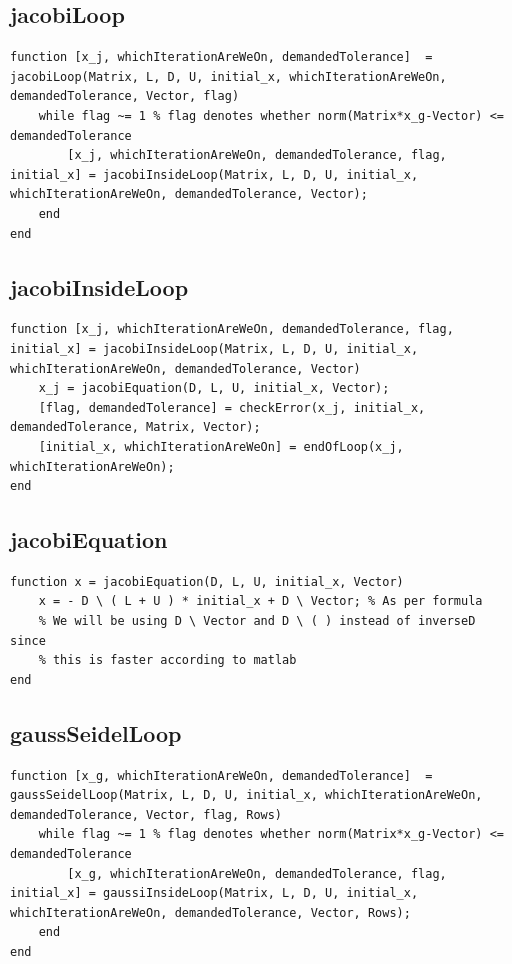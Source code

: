 \newpage
\subsection{jacobiLoop}
\begin{simplechar}
\begin{lstlisting}
function [x_j, whichIterationAreWeOn, demandedTolerance]  = jacobiLoop(Matrix, L, D, U, initial_x, whichIterationAreWeOn, demandedTolerance, Vector, flag)
    while flag ~= 1 % flag denotes whether norm(Matrix*x_g-Vector) <= demandedTolerance
        [x_j, whichIterationAreWeOn, demandedTolerance, flag, initial_x] = jacobiInsideLoop(Matrix, L, D, U, initial_x, whichIterationAreWeOn, demandedTolerance, Vector);
    end
end
\end{lstlisting}
\end{simplechar}

\subsection{jacobiInsideLoop}
\begin{simplechar}
\begin{lstlisting}
function [x_j, whichIterationAreWeOn, demandedTolerance, flag, initial_x] = jacobiInsideLoop(Matrix, L, D, U, initial_x, whichIterationAreWeOn, demandedTolerance, Vector)
    x_j = jacobiEquation(D, L, U, initial_x, Vector);
    [flag, demandedTolerance] = checkError(x_j, initial_x, demandedTolerance, Matrix, Vector);
    [initial_x, whichIterationAreWeOn] = endOfLoop(x_j, whichIterationAreWeOn);
end
\end{lstlisting}
\end{simplechar}

\subsection{jacobiEquation}
\begin{simplechar}
\begin{lstlisting}
function x = jacobiEquation(D, L, U, initial_x, Vector)
    x = - D \ ( L + U ) * initial_x + D \ Vector; % As per formula
    % We will be using D \ Vector and D \ ( ) instead of inverseD since
    % this is faster according to matlab
end
\end{lstlisting}
\end{simplechar}

\subsection{gaussSeidelLoop}
\begin{simplechar}
\begin{lstlisting}
function [x_g, whichIterationAreWeOn, demandedTolerance]  = gaussSeidelLoop(Matrix, L, D, U, initial_x, whichIterationAreWeOn, demandedTolerance, Vector, flag, Rows)
    while flag ~= 1 % flag denotes whether norm(Matrix*x_g-Vector) <= demandedTolerance
        [x_g, whichIterationAreWeOn, demandedTolerance, flag, initial_x] = gaussiInsideLoop(Matrix, L, D, U, initial_x, whichIterationAreWeOn, demandedTolerance, Vector, Rows);
    end
end
\end{lstlisting}
\end{simplechar}

